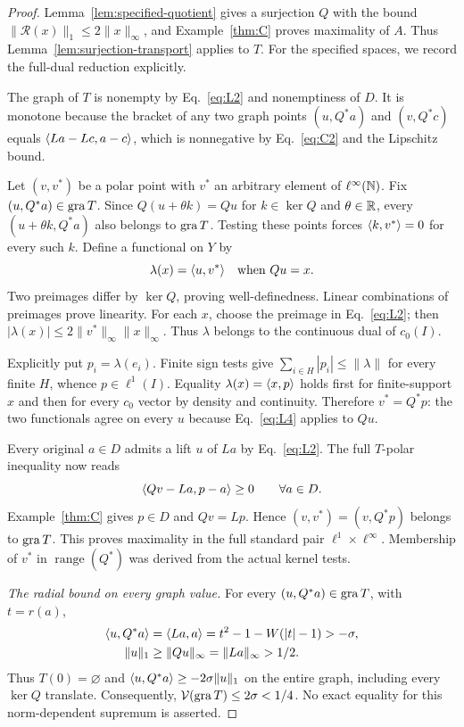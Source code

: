 \begin{proof}
Lemma~\ref{lem:specified-quotient} gives a surjection $Q$ with the
bound $\|\mathcal R(x)\|_1\le2\|x\|_\infty$, and Example~\ref{thm:C} proves maximality
of $A$. Thus Lemma~\ref{lem:surjection-transport} applies to $T$.
For the specified spaces, we record the full-dual reduction explicitly.

The graph of $T$ is nonempty by
Eq.~\eqref{eq:L2} and nonemptiness of $D$. It is monotone because the
bracket of any two graph points $(u,Q^*a)$ and $(v,Q^*c)$ equals
$\langle La-Lc,a-c\rangle$, which is nonnegative by Eq.~\eqref{eq:C2} and the Lipschitz bound.

Let $(v,v^*)$ be a polar point with $v^*$ an arbitrary element of
$\ell^\infty(\mathbb N)$. Fix $(u,Q^*a)\in\operatorname{gra} T$. Since
$Q(u+\theta k)=Qu$ for $k\in\ker Q$ and $\theta\in\mathbb R$,
every $(u+\theta k,Q^*a)$ also belongs to $\operatorname{gra} T$. Testing these points forces
$\langle k,v^*\rangle=0$ for every such $k$. Define a functional on $Y$ by
\begin{equation}
\lambda(x)=\langle u,v^*\rangle\quad\text{when }Qu=x.
\label{eq:L4}
\end{equation}
Two preimages differ by $\ker Q$, proving well-definedness. Linear
combinations of preimages prove linearity. For each $x$, choose the
preimage in Eq.~\eqref{eq:L2}; then
$|\lambda(x)|\le2\|v^*\|_\infty\|x\|_\infty$. Thus $\lambda$ belongs to
the continuous dual of $c_0(I)$.

Explicitly put $p_i=\lambda(e_i)$. Finite sign tests give
$\sum_{i\in H}|p_i|\le\|\lambda\|$ for every finite $H$, whence
$p\in\ell^1(I)$. Equality $\lambda(x)=\langle x,p\rangle$ holds first for
finite-support $x$ and then for every $c_0$ vector by density and continuity.
Therefore $v^*=Q^*p$: the two functionals agree on every $u$ because
Eq.~\eqref{eq:L4} applies to $Qu$.

Every original $a\in D$ admits a lift $u$ of $La$ by Eq.~\eqref{eq:L2}.
The full $T$-polar inequality now reads
\begin{equation}
\langle Qv-La,p-a\rangle\ge0\qquad\forall a\in D.
\label{eq:L5}
\end{equation}
Example~\ref{thm:C} gives $p\in D$ and $Qv=Lp$. Hence
$(v,v^*)=(v,Q^*p)$ belongs to $\operatorname{gra} T$. This proves maximality in the
full standard pair $\ell^1\times\ell^\infty$. Membership of $v^*$ in
$\operatorname{range}(Q^*)$ was derived from the actual kernel tests.

\noindent\textit{The radial bound on every graph value.}
\label{sec:L3}
For every $(u,Q^*a)\in\operatorname{gra} T$, with $t=r(a)$,
\begin{equation}
\begin{aligned}
\langle u,Q^*a\rangle&=\langle La,a\rangle
 =t^2-1-W(|t|-1)>-\sigma,\\
\|u\|_1&\ge\|Qu\|_\infty=\|La\|_\infty>1/2.
\end{aligned}
\label{eq:L6}
\end{equation}
Thus $T(0)=\varnothing$ and $\langle u,Q^*a\rangle\ge-2\sigma\|u\|_1$ on
the entire graph, including every $\ker Q$ translate. Consequently,
$\mathcal V(\operatorname{gra} T)\le2\sigma<1/4$. No exact equality for this
norm-dependent supremum is asserted.


\end{proof}
